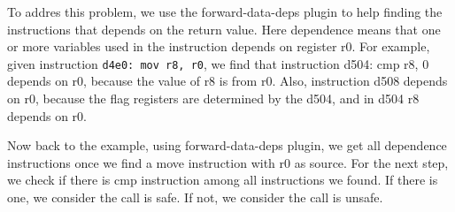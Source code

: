To addres this problem, we use the forward-data-deps plugin to help finding the
instructions that depends on the return value. Here dependence means that one or
more variables used in the instruction depends on register r0. For example,
given instruction \texttt{d4e0: mov r8, r0}, we find that instruction d504: cmp r8, 0
depends on r0, because the value of r8 is from r0. Also, instruction d508
depends on r0, because the flag registers are determined by the d504, and in
d504 r8 depends on r0.

Now back to the example, using forward-data-deps plugin, we get all dependence
instructions once we find a move instruction with r0 as source. For the next
step, we check if there is cmp instruction among all instructions we found. If
there is one, we consider the call is safe. If not, we consider the call is
unsafe.
